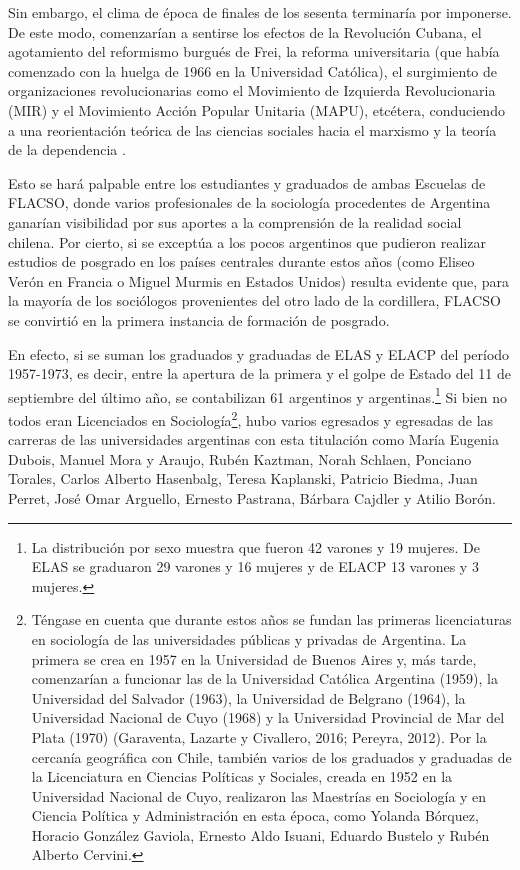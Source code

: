 Sin embargo, el clima de época de finales de los sesenta terminaría por imponerse. De este modo, comenzarían a sentirse los efectos de la Revolución Cubana, el agotamiento del reformismo burgués de Frei, la reforma universitaria (que había comenzado con la huelga de 1966 en la Universidad Católica), el surgimiento de organizaciones revolucionarias como el Movimiento de Izquierda Revolucionaria (MIR) y el Movimiento Acción Popular Unitaria (MAPU), etcétera, conduciendo a una reorientación teórica de las ciencias sociales hacia el marxismo y la teoría de la dependencia \parencite{1452-VASCONI1995}.

Esto se hará palpable entre los estudiantes y graduados de ambas Escuelas de FLACSO, donde varios profesionales de la sociología procedentes de Argentina ganarían visibilidad por sus aportes a la comprensión de la realidad social chilena. Por cierto, si se exceptúa a los pocos argentinos que pudieron realizar estudios de posgrado en los países centrales durante estos años (como Eliseo Verón en Francia o Miguel Murmis en Estados Unidos) resulta evidente que, para la mayoría de los sociólogos provenientes del otro lado de la cordillera, FLACSO se convirtió en la primera instancia de formación de posgrado.

En efecto, si se suman los graduados y graduadas de ELAS y ELACP del período 1957-1973, es decir, entre la apertura de la primera y el golpe de Estado del 11 de septiembre del último año, se contabilizan 61 argentinos y argentinas.\footnote{La distribución por sexo muestra que fueron 42 varones y 19 mujeres. De ELAS se graduaron 29 varones y 16 mujeres y de ELACP 13 varones y 3 mujeres.} Si bien no todos eran Licenciados en Sociología\footnote{Téngase en cuenta que durante estos años se fundan las primeras licenciaturas en sociología de las universidades públicas y privadas de Argentina. La primera se crea en 1957 en la Universidad de Buenos Aires y, más tarde, comenzarían a funcionar las de la Universidad Católica Argentina (1959), la Universidad del Salvador (1963), la Universidad de Belgrano (1964), la Universidad Nacional de Cuyo (1968) y la Universidad Provincial de Mar del Plata (1970) \parencite{1616-DIAZ2016,1622-FICCARDI2013}(Garaventa, Lazarte y Civallero, 2016; Pereyra, 2012). Por la cercanía geográfica con Chile, también varios de los graduados y graduadas de la Licenciatura en Ciencias Políticas y Sociales, creada en 1952 en la Universidad Nacional de Cuyo, realizaron las Maestrías en Sociología y en Ciencia Política y Administración en esta época, como Yolanda Bórquez, Horacio González Gaviola, Ernesto Aldo Isuani, Eduardo Bustelo y Rubén Alberto Cervini.}, hubo varios egresados y egresadas de las carreras de las universidades argentinas con esta titulación como María Eugenia Dubois, Manuel Mora y Araujo, Rubén Kaztman, Norah Schlaen, Ponciano Torales, Carlos Alberto Hasenbalg, Teresa Kaplanski, Patricio Biedma, Juan Perret, José Omar Arguello, Ernesto Pastrana, Bárbara Cajdler y Atilio Borón.

